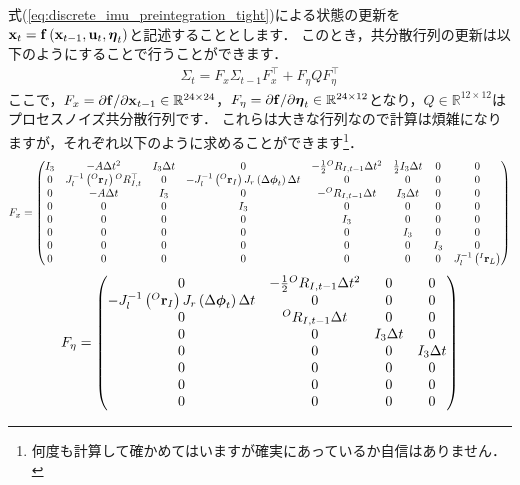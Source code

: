 式(\ref{eq:discrete_imu_preintegration_tight})による状態の更新を${\bf x}_{t} = {\bf f} \left( {\bf x}_{t-1}, {\bf u}_{t}, \boldsymbol \eta_{t} \right)$と記述することとします．
このとき，共分散行列の更新は以下のようにすることで行うことができます．
%
\begin{align}
  \Sigma_{t} = F_{x} \Sigma_{t-1} F_{x}^{\top} + F_{\eta} Q F_{\eta}^{\top}
\end{align}
%
ここで，$F_{x} = \partial {\bf f} / \partial {\bf x}_{t-1} \in \mathbb{R}^{24 \times 24}$，$F_{\eta} = \partial {\bf f} / \partial \boldsymbol \eta_{t} \in \mathbb{R}^{24 \times 12}$となり，$Q \in \mathbb{R}^{12 \times 12}$はプロセスノイズ共分散行列です．
これらは大きな行列なので計算は煩雑になりますが，それぞれ以下のように求めることができます\footnote{何度も計算して確かめてはいますが確実にあっているか自信はありません．}．
%
\begin{align}
  F_{x} = \left( \begin{matrix}
    I_{3} & -A \Delta t^{2} & I_{3} \Delta t & 0 & -\frac{1}{2} {}^{O}R_{I, t-1} \Delta t^{2} & \frac{1}{2} I_{3} \Delta t & 0 & 0 \\
%
    0 & J_{l}^{-1} \left( {}^{O}{\bf r}_{I} \right) {}^{O}R_{I, t}^{\top} & 0 & -J_{l}^{-1} \left( {}^{O}{\bf r}_{I} \right) J_{r} \left( \Delta \boldsymbol \phi_{t} \right) \Delta t & 0 & 0 & 0 & 0 \\
%
    0 & -A \Delta t & I_{3} & 0 & -{}^{O}R_{I, t-1} \Delta t & I_{3} \Delta t & 0 & 0 \\
%
    0 & 0 & 0 & I_{3} & 0 & 0 & 0 & 0 \\
%
    0 & 0 & 0 & 0 & I_{3} & 0 & 0 & 0 \\
%
    0 & 0 & 0 & 0 & 0 & I_{3} & 0 & 0 \\
%
    0 & 0 & 0 & 0 & 0 & 0 & I_{3} & 0 \\
%
    0 & 0 & 0 & 0 & 0 & 0 & 0 & J_{l}^{-1} \left( {}^{I}{\bf r}_{L} \right) \\
  \end{matrix} \right)
  \label{eq:covariance_update_fx}
\end{align}
%
\begin{align}
  F_{\eta} = \left( \begin{matrix}
    0 & -\frac{1}{2} {}^{O}R_{I, t-1} \Delta t^{2} & 0 & 0 \\
%
    -J_{l}^{-1} \left( {}^{O}{\bf r}_{I} \right) J_{r} \left( \Delta \boldsymbol \phi_{t} \right) \Delta t & 0 & 0 & 0 \\
%
    0 & {}^{O}R_{I, t-1} \Delta t & 0 & 0 \\
%
    0 & 0 & I_{3} \Delta t & 0 \\
%
    0 & 0 & 0 & I_{3} \Delta t \\
%
    0 & 0 & 0 & 0 \\
%
    0 & 0 & 0 & 0 \\
%
    0 & 0 & 0 & 0 \\
  \end{matrix} \right)
  \label{eq:covariance_update_feta}
\end{align}
